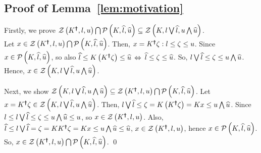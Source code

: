 
%
\subsection*{Proof of Lemma~\ref{lem:motivation}}
Firstly, we prove $\mathcal{Z}\left(K^{\bm{\dagger}},l,u\right) \bigcap
\mathcal{P}\left(K,\widehat{l},\widehat{u}\right) \subseteq \mathcal{Z}\left(K,l\bigvee
  \widehat{l},u\bigwedge \widehat{u}\right)$.\\  Let $x\in\mathcal{Z}\left(K^{\bm{\dagger}},l,u\right) \bigcap
\mathcal{P}\left(K,\widehat{l},\widehat{u}\right)$.  Then, $x=K^{\bm{\dagger}}\zeta:
l\leq\zeta\leq u$.  Since $x\in\mathcal{P}\left(K,\widehat{l},\widehat{u}\right)$, so also
$\widehat{l}\leq K\left(K^{\bm{\dagger}}\zeta\right)\leq \widehat{u}$ $\Leftrightarrow$ $\widehat{l}\leq \zeta\leq \widehat{u}$.  So,
$l\bigvee \widehat{l}\leq \zeta\leq u\bigwedge\widehat{u}$.  Hence, $x\in\mathcal{Z}\left(K,l\bigvee
  \widehat{l},u\bigwedge \widehat{u}\right)$.

Next, we show $\mathcal{Z}\left(K,l\bigvee \widehat{l},u\bigwedge \widehat{u}\right) \subseteq
\mathcal{Z}\left(K^{\bm{\dagger}},l,u\right) \bigcap \mathcal{P}\left(K,\widehat{l},\widehat{u}\right)$. Let
$x=K^{\bm{\dagger}}\zeta\in\mathcal{Z}\left(K,l\bigvee \widehat{l},u\bigwedge \widehat{u}\right)$.
Then, $l\bigvee\widehat{l}\leq \zeta = K\left(K^{\bm{\dagger}}\zeta\right)=Kx\leq
u\bigwedge\widehat{u}$.  Since $l\leq l\bigvee\widehat{l} \leq \zeta\leq
u\bigwedge \widehat{u}\leq u$, so $x\in \mathcal{Z}\left(K^{\bm{\dagger}},l,u\right)$.  Also,
$\widehat{l}\leq l\bigvee\widehat{l} = \zeta = KK^{\bm{\dagger}}\zeta = Kx\leq
u\bigwedge \widehat{u}\leq \widehat{u}$, $x\in \mathcal{Z}\left(K^{\bm{\dagger}},l,u\right)$, hence
$x\in\mathcal{P}\left(K,\widehat{l},\widehat{u}\right)$.  So, $x\in\mathcal{Z}\left(K^{\bm{\dagger}},l,u\right)
\bigcap \mathcal{P}\left(K,\widehat{l},\widehat{u}\right)$. \qed


